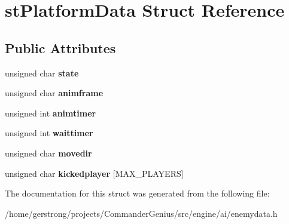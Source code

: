\hypertarget{structst_platform_data}{
\section{stPlatformData Struct Reference}
\label{structst_platform_data}
}
\subsection*{Public Attributes}
\begin{DoxyCompactItemize}
\item 
\hypertarget{structst_platform_data_aa563f5dff298fdd92313047049e9e593}{
unsigned char {\bfseries state}}
\label{structst_platform_data_aa563f5dff298fdd92313047049e9e593}

\item 
\hypertarget{structst_platform_data_ad7ad0f7f658f80eab804a9ddb7b58bba}{
unsigned char {\bfseries animframe}}
\label{structst_platform_data_ad7ad0f7f658f80eab804a9ddb7b58bba}

\item 
\hypertarget{structst_platform_data_a1e58978d4e12e3c87f2908ddf4bf834d}{
unsigned int {\bfseries animtimer}}
\label{structst_platform_data_a1e58978d4e12e3c87f2908ddf4bf834d}

\item 
\hypertarget{structst_platform_data_ad35eeb59a0ba64244a565b7cb6eb6474}{
unsigned int {\bfseries waittimer}}
\label{structst_platform_data_ad35eeb59a0ba64244a565b7cb6eb6474}

\item 
\hypertarget{structst_platform_data_a293f00b63db69a4aa0cf7d33c3730413}{
unsigned char {\bfseries movedir}}
\label{structst_platform_data_a293f00b63db69a4aa0cf7d33c3730413}

\item 
\hypertarget{structst_platform_data_accc2f68b777e44a9c31da987c4dd25f6}{
unsigned char {\bfseries kickedplayer} \mbox{[}MAX\_\-PLAYERS\mbox{]}}
\label{structst_platform_data_accc2f68b777e44a9c31da987c4dd25f6}

\end{DoxyCompactItemize}


The documentation for this struct was generated from the following file:\begin{DoxyCompactItemize}
\item 
/home/gerstrong/projects/CommanderGenius/src/engine/ai/enemydata.h\end{DoxyCompactItemize}
